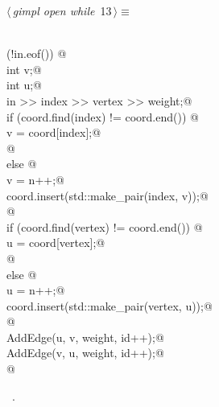 \documentclass[12pt]{article}
\begin{document}
\begin{flushleft} \small
\begin{minipage}{\linewidth}\label{scrap24}\raggedright\small
{} $\langle\,${\itshape gimpl open while}\nobreak\ {\footnotesize {13}}$\,\rangle\equiv$
\vspace{-1ex}
\begin{list}{}{} \item
\mbox{}\verb@@\\
\mbox{}\verb@while (!in.eof()) {@\\
\mbox{}\verb@          int v;@\\
\mbox{}\verb@          int u;@\\
\mbox{}\verb@          in >> index >> vertex >> weight;@\\
\mbox{}\verb@          if (coord.find(index) != coord.end()) {@\\
\mbox{}\verb@              v = coord[index];@\\
\mbox{}\verb@          }@\\
\mbox{}\verb@          else {@\\
\mbox{}\verb@              v = n++;@\\
\mbox{}\verb@              coord.insert(std::make_pair(index, v));@\\
\mbox{}\verb@          }@\\
\mbox{}\verb@          if (coord.find(vertex) != coord.end()) {@\\
\mbox{}\verb@              u = coord[vertex];@\\
\mbox{}\verb@          }@\\
\mbox{}\verb@          else {@\\
\mbox{}\verb@              u = n++;@\\
\mbox{}\verb@              coord.insert(std::make_pair(vertex, u));@\\
\mbox{}\verb@          }@\\
\mbox{}\verb@          AddEdge(u, v, weight, id++);@\\
\mbox{}\verb@          AddEdge(v, u, weight, id++);@\\
\mbox{}\verb@} @\\
\mbox{}\verb@@{\NWsep}
\end{list}
\vspace{-1.5ex}
\footnotesize
\begin{list}{}{\setlength{\itemsep}{-\parsep}\setlength{\itemindent}{-\leftmargin}}
\item \NWtxtMacroRefIn\ .

\item{}
\end{list}
\end{minipage}\vspace{4ex}
\end{flushleft}
\end{document}
